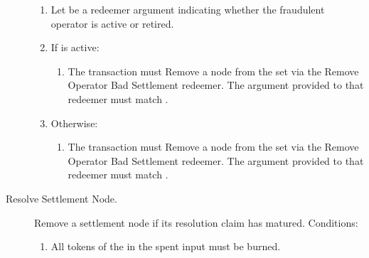 \documentclass[../midgard.tex]{subfiles}
\begin{document}
\begin{description}
\begin{enumerate}
        \item Let  be a redeemer argument indicating whether the fraudulent operator is active or retired.
        \item If  is active:
            \begin{enumerate}
                \item The transaction must Remove a node from the  set via the Remove Operator Bad Settlement redeemer.
                  The  argument provided to that redeemer must match .
            \end{enumerate}
        \item Otherwise:
            \begin{enumerate}
                \item The transaction must Remove a node from the  set via the Remove Operator Bad Settlement redeemer.
                  The  argument provided to that redeemer must match .
            \end{enumerate}
      \end{enumerate}
  \item[Resolve Settlement Node.] Remove a settlement node if its resolution claim has matured.
    Conditions:
      \begin{enumerate}
          \item All tokens of the  in the spent input must be burned.
      \end{enumerate}
\end{description}
\end{document}
